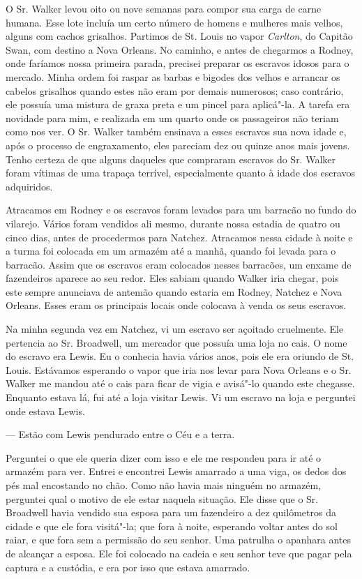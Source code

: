 O Sr. Walker levou oito ou nove semanas para compor sua carga de carne
humana. Esse lote incluía um certo número de homens e mulheres mais
velhos, alguns com cachos grisalhos. Partimos de St. Louis no vapor
\emph{Carlton}, do Capitão Swan, com destino a Nova Orleans. No caminho,
e antes de chegarmos a Rodney, onde faríamos nossa primeira parada,
precisei preparar os escravos idosos para o mercado. Minha ordem foi
raspar as barbas e bigodes dos velhos e arrancar os cabelos grisalhos
quando estes não eram por demais numerosos; caso contrário, ele possuía
uma mistura de graxa preta e um pincel para aplicá"-la. A tarefa era
novidade para mim, e realizada em um quarto onde os passageiros não
teriam como nos ver. O Sr. Walker também ensinava a esses escravos sua
nova idade e, após o processo de engraxamento, eles pareciam dez ou
quinze anos mais jovens. Tenho certeza de que alguns daqueles que
compraram escravos do Sr. Walker foram vítimas de uma trapaça terrível,
especialmente quanto à idade dos escravos adquiridos.

Atracamos em Rodney e os escravos foram levados para um barracão no
fundo do vilarejo. Vários foram vendidos ali mesmo, durante nossa
estadia de quatro ou cinco dias, antes de procedermos para Natchez.
Atracamos nessa cidade à noite e a turma foi colocada em um armazém até
a manhã, quando foi levada para o barracão. Assim que os escravos eram
colocados nesses barracões, um enxame de fazendeiros aparece ao seu
redor. Eles sabiam quando Walker iria chegar, pois este sempre anunciava
de antemão quando estaria em Rodney, Natchez e Nova Orleans. Esses eram
os principais locais onde colocava à venda os seus escravos.

Na minha segunda vez em Natchez, vi um escravo ser açoitado cruelmente.
Ele pertencia ao Sr. Broadwell, um mercador que possuía uma loja no
cais. O nome do escravo era Lewis. Eu o conhecia havia vários anos, pois
ele era oriundo de St. Louis. Estávamos esperando o vapor que iria nos
levar para Nova Orleans e o Sr. Walker me mandou até o cais para ficar
de vigia e avisá"-lo quando este chegasse. Enquanto estava lá, fui até a
loja visitar Lewis. Vi um escravo na loja e perguntei onde estava Lewis.

--- Estão com Lewis pendurado entre o Céu e a terra.

Perguntei o que ele queria dizer com isso e ele me respondeu para ir até
o armazém para ver. Entrei e encontrei Lewis amarrado a uma viga, os
dedos dos pés mal encostando no chão. Como não havia mais ninguém no
armazém, perguntei qual o motivo de ele estar naquela situação. Ele
disse que o Sr. Broadwell havia vendido sua esposa para um fazendeiro a
dez quilômetros da cidade e que ele fora visitá"-la; que fora à noite,
esperando voltar antes do sol raiar, e que fora sem a permissão do seu
senhor. Uma patrulha o apanhara antes de alcançar a esposa. Ele foi
colocado na cadeia e seu senhor teve que pagar pela captura e a
custódia, e era por isso que estava amarrado.

